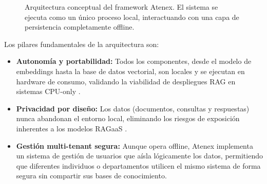 \begin{figure}[ht]
    \centering
    \caption{Arquitectura conceptual del framework Atenex. El sistema se ejecuta como un único proceso local, interactuando con una capa de persistencia completamente offline.}
    \label{fig:atenex_architecture}
\end{figure}

Los pilares fundamentales de la arquitectura son:
\begin{itemize}
    \item \textbf{Autonomía y portabilidad:} Todos los componentes, desde el modelo de embeddings hasta la base de datos vectorial, son locales y se ejecutan en hardware de consumo, validando la viabilidad de despliegues RAG en sistemas CPU-only \cite{Tyndall2025OfflineRAG}.
    \item \textbf{Privacidad por diseño:} Los datos (documentos, consultas y respuestas) nunca abandonan el entorno local, eliminando los riesgos de exposición inherentes a los modelos RAGaaS \cite{Cheng2025RemoteRAG}.
    \item \textbf{Gestión multi-tenant segura:} Aunque opera offline, Atenex implementa un sistema de gestión de usuarios que aísla lógicamente los datos, permitiendo que diferentes individuos o departamentos utilicen el mismo sistema de forma segura sin compartir sus bases de conocimiento.
\end{itemize}

